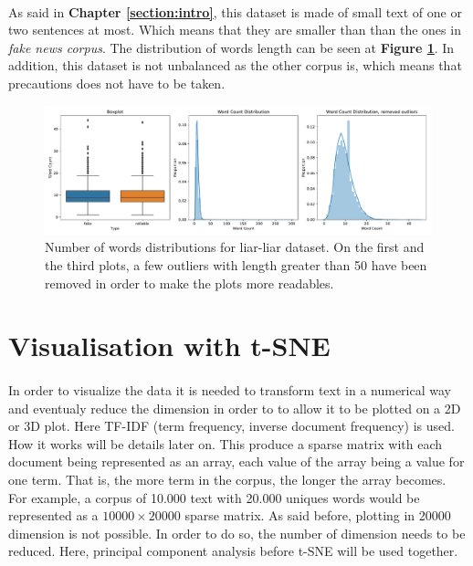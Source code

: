 \paragraph{} As said in \textbf{Chapter \ref{section:intro}}, this dataset is made of small text of one or two sentences at most. Which means that they are smaller than than the ones in \textit{fake news corpus}. The distribution of words length can be seen at \textbf{Figure \ref{fig:data_explo:summary3}}. In addition, this dataset is not unbalanced as the other corpus is, which means that precautions does not have to be taken. 
\begin{figure}[h]
  \centering
  \includegraphics[width=\textwidth]{chapter/images/data_exploration/liar_liar_summary.pdf}
  \caption{Number of words distributions for liar-liar dataset. On the first and the third plots, a few outliers with length greater than 50 have been removed in order to make the plots more readables.}
  \label{fig:data_explo:summary3}
\end{figure}

\section{Visualisation with t-SNE}
\paragraph{} In order to visualize the data it is needed to transform text in a numerical way and eventualy reduce the dimension in order to to allow it to be plotted on a 2D or 3D plot. Here TF-IDF (term frequency, inverse document frequency\cite{Robertson2004,Jones2004}) is used. How it works will be details later on. This produce a sparse matrix with each document being represented as an array, each value of the array being a value for one term. That is, the more term in the corpus, the longer the array becomes. For example, a corpus of 10.000 text with 20.000 uniques words would be represented as a $10000 \times 20000$ sparse matrix. As said before, plotting in 20000 dimension is not possible. In order to do so, the number of dimension needs to be reduced. Here, principal component analysis before t-SNE\cite{Maaten2008} will be used together. 


